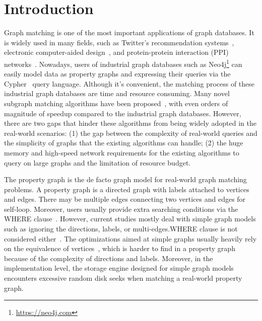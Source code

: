 \section{Introduction}
Graph matching is one of the most important applications of graph databases.
It is widely used in many fields,
such as Twitter's recommendation systems~\cite{DBLP:journals/pvldb/GuptaSGGZLL14,DBLP:journals/pvldb/SharmaJBLL16},
electronic computer-aided design~\cite{DBLP:conf/dac/OhlrichEGS93},
and protein-protein interaction (PPI) networks~\cite{milenkovic2008uncovering}.
Nowadays, users of industrial graph databases such as Neo4j\footnote{\url{https://neo4j.com}}
can easily model data as property graphs and expressing their queries via the Cypher~\cite{DBLP:conf/sigmod/FrancisGGLLMPRS18} query language.
Although it's convenient, the matching process of these industrial graph databases are time and resource consuming.
Many novel subgraph matching algorithms have been proposed~\cite{DBLP:journals/pvldb/SunWWSL12,DBLP:conf/sigmod/HanLL13,DBLP:conf/sigmod/ShaoCCMYX14,DBLP:conf/cloud/SerafiniMS17,DBLP:journals/pvldb/QiaoZC17,DBLP:conf/sigmod/DiasTGM019}, with even orders of magnitude of speedup compared to the industrial graph databases.
However, there are two gaps that hinder these algorithms from being widely adopted in the real-world scenarios:
(1) the gap between the complexity of real-world queries and the simplicity of graphs that the existing algorithms can handle;
(2) the huge memory and high-speed network requirements for the existing algorithms to query on large graphs and the limitation of resource budget.

The property graph is the de facto graph model for real-world graph matching problems.
A property graph is a directed graph with labels attached to vertices and edges. There may be multiple edges connecting two vertices and edges for self-loop. 
Moreover, users usually provide extra searching conditions via the WHERE clause~\cite{DBLP:journals/csur/AnglesABHRV17}. However,  current studies mostly deal with simple graph models such as ignoring the directions, labels, or multi-edges.WHERE clause is not considered either~\cite{DBLP:journals/pvldb/SunWWSL12,DBLP:conf/sigmod/HanLL13,DBLP:conf/sigmod/KimLBHLKJ16,DBLP:journals/pvldb/QiaoZC17,DBLP:journals/pvldb/MhedhbiS19}. The optimizations aimed at simple graphs usually heavily rely on the equivalence of vertices~\cite{DBLP:conf/sigmod/HanLL13,DBLP:journals/pvldb/QiaoZC17}, which is harder to find in a property graph because of the complexity of directions and labels. Moreover, in the implementation level, the storage engine designed for simple graph models encounters excessive random disk seeks when matching a real-world property graph.

